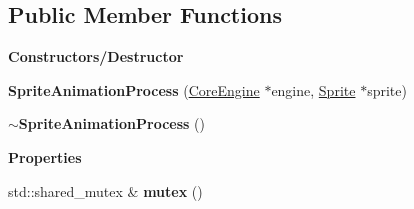 \subsection*{Public Member Functions}
\begin{Indent}\textbf{ Constructors/\+Destructor}\par
\begin{DoxyCompactItemize}
\item 
\mbox{\label{classrev_1_1_sprite_animation_process_a1949b23ddc1ecda2ff49a8acf3bb203c}} 
{\bfseries Sprite\+Animation\+Process} (\mbox{\hyperlink{classrev_1_1_core_engine}{Core\+Engine}} $\ast$engine, \mbox{\hyperlink{classrev_1_1_sprite}{Sprite}} $\ast$sprite)
\item 
\mbox{\label{classrev_1_1_sprite_animation_process_a116ec8955c566ea34280eddbd0eb0c6b}} 
{\bfseries $\sim$\+Sprite\+Animation\+Process} ()
\end{DoxyCompactItemize}
\end{Indent}
\begin{Indent}\textbf{ Properties}\par
\begin{DoxyCompactItemize}
\item 
\mbox{\label{classrev_1_1_sprite_animation_process_ad39f3c023b525967d5b5868697d4abc5}} 
std\+::shared\+\_\+mutex \& {\bfseries mutex} ()
\end{DoxyCompactItemize}
\end{Indent}
